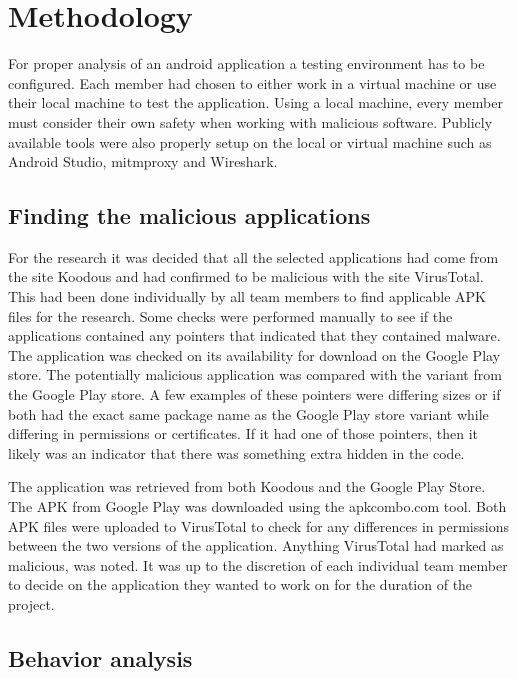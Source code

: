 \section{Methodology}

For proper analysis of an android application a testing environment has to be configured.
Each member had chosen to either work in a virtual machine or use their local machine to test the application.
Using a local machine, every member must consider their own safety when working with malicious software.
Publicly available tools were also properly setup on the local or virtual machine such as Android Studio, mitmproxy and Wireshark.

\subsection{Finding the malicious applications}

For the research it was decided that all the selected applications had come from the site Koodous and had confirmed to be malicious with the site VirusTotal.
This had been done individually by all team members to find applicable APK files for the research.
Some checks were performed manually to see if the applications contained any pointers that indicated that they contained malware.
The application was checked on its availability for download on the Google Play store.
The potentially malicious application was compared with the variant from the Google Play store.
A few examples of these pointers were differing sizes or if both had the exact same package name as the Google Play store variant while differing in permissions or certificates.
If it had one of those pointers, then it likely was an indicator that there was something extra hidden in the code.

The application was retrieved from both Koodous and the Google Play Store.
The APK from Google Play was downloaded using the apkcombo.com tool.
Both APK files were uploaded to VirusTotal to check for any differences in permissions between the two versions of the application.
Anything VirusTotal had marked as malicious, was noted.
It was up to the discretion of each individual team member to decide on the application they wanted to work on for the duration of the project.

\subsection{Behavior analysis}

